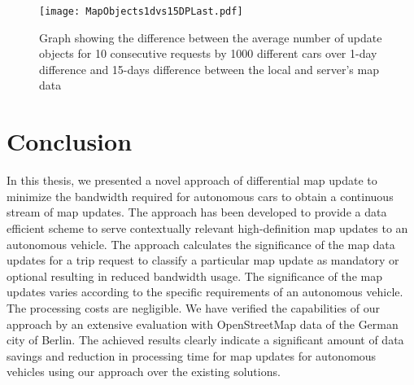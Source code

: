 \begin{figure}
\centering
\texttt{[image: MapObjects1dvs15DPLast.pdf]}
\caption{Graph showing the difference between the average number of update objects for 10 consecutive requests by 1000 different cars over 1-day difference and 15-days difference between the local and server's map data }
\label{fg:ber10x1000mo}
\end{figure}

  





\chapter{Conclusion} \label{ch:conclusion}
In this thesis, we presented a novel approach of differential map update to minimize the bandwidth required for autonomous cars to obtain a continuous stream of map updates. The approach has been developed to provide a data efficient scheme to serve contextually relevant high-definition map updates to an autonomous vehicle. The approach calculates the significance of the map data updates for a trip request to classify a particular map update as mandatory or optional resulting in reduced bandwidth usage. The significance of the map updates varies according to the specific requirements of an autonomous vehicle. The processing costs are negligible. We have verified the capabilities of our approach by an extensive evaluation with OpenStreetMap data of the German city of Berlin. The achieved results clearly indicate a significant amount of data savings and reduction in processing time for map updates for autonomous vehicles using our approach over the existing solutions.    
